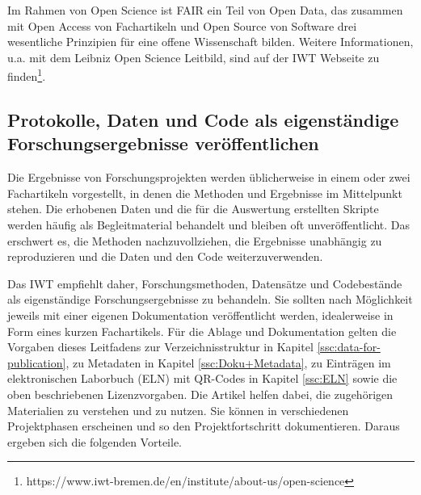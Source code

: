 Im Rahmen von Open Science ist FAIR ein Teil von Open Data, das zusammen mit Open Access von Fachartikeln und Open Source von Software drei wesentliche Prinzipien für eine offene Wissenschaft bilden. Weitere Informationen, u.a. mit dem Leibniz Open Science Leitbild, sind auf der IWT Webseite zu finden\footnote{https://www.iwt-bremen.de/en/institute/about-us/open-science}.



\subsection{Protokolle, Daten und Code als eigenständige Forschungsergebnisse veröffentlichen}
\label{sec:standalone-outputs}

Die Ergebnisse von Forschungsprojekten werden üblicherweise in einem oder zwei
Fachartikeln vorgestellt, in denen die Methoden und Ergebnisse im Mittelpunkt stehen.
Die erhobenen Daten und die für die Auswertung erstellten Skripte werden häufig als
Begleitmaterial behandelt und bleiben oft unveröffentlicht. Das erschwert es, die
Methoden nachzuvollziehen, die Ergebnisse unabhängig zu reproduzieren und die Daten
und den Code weiterzuverwenden.

Das IWT empfiehlt daher, Forschungsmethoden, Datensätze und Codebestände als
eigenständige Forschungsergebnisse zu behandeln. Sie sollten nach Möglichkeit jeweils
mit einer eigenen Dokumentation veröffentlicht werden, idealerweise in Form eines
kurzen Fachartikels. Für die Ablage und Dokumentation gelten die Vorgaben dieses
Leitfadens zur Verzeichnisstruktur in Kapitel \ref{ssc:data-for-publication}, zu Metadaten
in Kapitel \ref{ssc:Doku+Metadata}, zu Einträgen im elektronischen Laborbuch (ELN) mit
QR-Codes in Kapitel \ref{ssc:ELN} sowie die oben beschriebenen Lizenzvorgaben. Die Artikel
helfen dabei, die zugehörigen Materialien zu verstehen und zu nutzen. Sie können in
verschiedenen Projektphasen erscheinen und so den Projektfortschritt dokumentieren.
Daraus ergeben sich die folgenden Vorteile.


